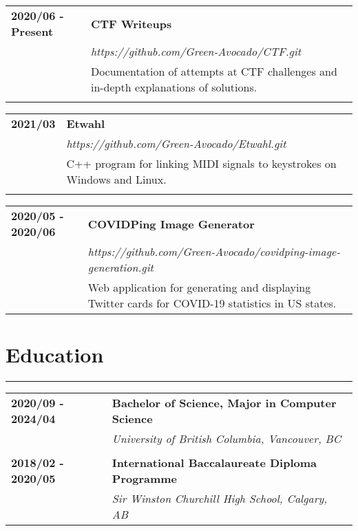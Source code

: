 \documentclass[letterpaper]{article}
\newcommand{\horizontalLine}{%
    \rule{\textwidth}{0.2pt}
    \vspace{1ex}
}
\begin{document}
        \begin{tabular}{p{} p{}} 
            \textbf{2020/06 - Present} & \large\textbf{CTF Writeups} \\
            & \emph{https://github.com/Green-Avocado/CTF.git} \\
            & Documentation of attempts at CTF challenges and in-depth explanations of solutions. \\
            \\
        \end{tabular}

        \begin{tabular}{p{} p{}} 
            \textbf{2021/03} & \large\textbf{Etwahl} \\
            & \emph{https://github.com/Green-Avocado/Etwahl.git} \\
            & C++ program for linking MIDI signals to keystrokes on Windows and Linux. \\
            \\
        \end{tabular}

        \begin{tabular}{p{} p{}} 
            \textbf{2020/05 - 2020/06} & \large\textbf{COVIDPing Image Generator} \\
            & \emph{https://github.com/Green-Avocado/covidping-image-generation.git} \\
            & Web application for generating and displaying Twitter cards for COVID-19 statistics in US states. \\
        \end{tabular}

    \section*{Education}

        \horizontalLine

        \begin{tabular}{p{} p{}} 
            \textbf{2020/09 - 2024/04} & \large\textbf{Bachelor of Science, Major in Computer Science} \\
            & \emph{University of British Columbia, Vancouver, BC} \\
            \\
            \textbf{2018/02 - 2020/05} & \large\textbf{International Baccalaureate Diploma Programme} \\
            & \emph{Sir Winston Churchill High School, Calgary, AB} \\
        \end{tabular}
\end{document}
